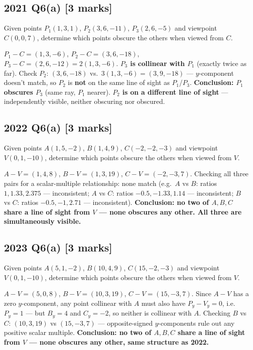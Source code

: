 \documentclass[12pt, a4paper]{article}
\newenvironment{solutionbox}{\begin{mdframed}[style=solutionframe]}{\end{mdframed}}
\newenvironment{answerbox}{\begin{mdframed}[style=answerframe]}{\end{mdframed}}
\begin{document}
\subsection*{2021 Q6(a) [3 marks]}
\begin{solutionbox}
Given points $P_1(1,3,1)$, $P_2(3,6,-11)$, $P_3(2,6,-5)$ and viewpoint $C(0,0,7)$, determine which points obscure the others when viewed from $C$.
\end{solutionbox}
\begin{answerbox}
$P_1-C=(1,3,-6)$, $P_2-C=(3,6,-18)$, $P_3-C=(2,6,-12)=2(1,3,-6)$. \textbf{$P_3$ is collinear with $P_1$} (exactly twice as far). Check $P_2$: $(3,6,-18)$ vs.\ $3(1,3,-6)=(3,9,-18)$ --- $y$-component doesn't match, so $P_2$ is \textbf{not} on the same line of sight as $P_1$/$P_3$.
\textbf{Conclusion: $P_1$ obscures $P_3$} (same ray, $P_1$ nearer). \textbf{$P_2$ is on a different line of sight} --- independently visible, neither obscuring nor obscured.
\end{answerbox}

\subsection*{2022 Q6(a) [3 marks]}
\begin{solutionbox}
Given points $A(1,5,-2)$, $B(1,4,9)$, $C(-2,-2,-3)$ and viewpoint $V(0,1,-10)$, determine which points obscure the others when viewed from $V$.
\end{solutionbox}
\begin{answerbox}
$A-V=(1,4,8)$, $B-V=(1,3,19)$, $C-V=(-2,-3,7)$. Checking all three pairs for a scalar-multiple relationship: none match (e.g.\ $A$ vs $B$: ratios $1, 1.33, 2.375$ --- inconsistent; $A$ vs $C$: ratios $-0.5,-1.33,1.14$ --- inconsistent; $B$ vs $C$: ratios $-0.5,-1,2.71$ --- inconsistent).
\textbf{Conclusion: no two of $A,B,C$ share a line of sight from $V$ --- none obscures any other. All three are simultaneously visible.}
\end{answerbox}

\subsection*{2023 Q6(a) [3 marks]}
\begin{solutionbox}
Given points $A(5,1,-2)$, $B(10,4,9)$, $C(15,-2,-3)$ and viewpoint $V(0,1,-10)$, determine which points obscure the others when viewed from $V$.
\end{solutionbox}
\begin{answerbox}
$A-V=(5,0,8)$, $B-V=(10,3,19)$, $C-V=(15,-3,7)$. Since $A-V$ has a zero $y$-component, any point collinear with $A$ must also have $P_y-V_y=0$, i.e.\ $P_y=1$ --- but $B_y=4$ and $C_y=-2$, so neither is collinear with $A$. Checking $B$ vs $C$: $(10,3,19)$ vs $(15,-3,7)$ --- opposite-signed $y$-components rule out any positive scalar multiple.
\textbf{Conclusion: no two of $A,B,C$ share a line of sight from $V$ --- none obscures any other, same structure as 2022.}
\end{answerbox}
\end{document}

